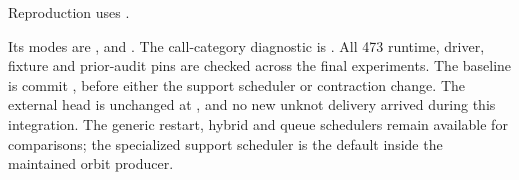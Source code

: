 

Reproduction uses .

Its modes are ,  and . The call-category
diagnostic is . All 473 runtime, driver,
fixture and prior-audit pins are checked across the final experiments.
The baseline is commit , before either the support scheduler
or contraction change. The external  head is unchanged
at , and no new unknot
delivery arrived during this integration. The generic restart, hybrid and
queue schedulers remain available for comparisons; the specialized support
scheduler is the default inside the maintained orbit producer.
